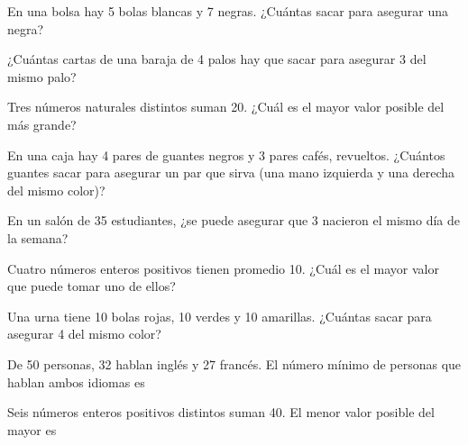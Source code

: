 \taller
{}
\begin{ejercicios}
\item En una bolsa hay 5 bolas blancas y 7 negras. ¿Cuántas sacar para asegurar una negra? 
\item ¿Cuántas cartas de una baraja de 4 palos hay que sacar para asegurar 3 del mismo palo? 
\item Tres números naturales distintos suman 20. ¿Cuál es el mayor valor posible del más grande? 
\end{ejercicios}
\begin{ejercicios}
\item En una caja hay 4 pares de guantes negros y 3 pares cafés, revueltos. ¿Cuántos guantes sacar para asegurar un par que sirva (una mano izquierda y una derecha del mismo color)? 
\item En un salón de 35 estudiantes, ¿se puede asegurar que 3 nacieron el mismo día de la semana? 
\item Cuatro números enteros positivos tienen promedio 10. ¿Cuál es el mayor valor que puede tomar uno de ellos? 
\end{ejercicios}
\begin{ejercicios}
\item Una urna tiene 10 bolas rojas, 10 verdes y 10 amarillas. ¿Cuántas sacar para asegurar 4 del mismo color?
\item De 50 personas, 32 hablan inglés y 27 francés. El número mínimo de personas que hablan ambos idiomas es
\item Seis números enteros positivos distintos suman 40. El menor valor posible del mayor es
\end{ejercicios}

\bitacora

